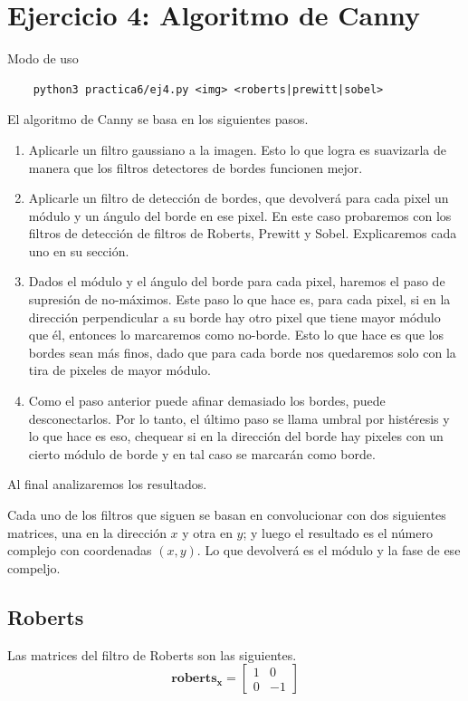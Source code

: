 \documentclass[11pt, spanish]{article}
\begin{document}
\newpage
\section{Ejercicio 4: Algoritmo de Canny}

Modo de uso
\begin{verbatim}
    python3 practica6/ej4.py <img> <roberts|prewitt|sobel>
\end{verbatim}

El algoritmo de Canny se basa en los siguientes pasos.

\begin{enumerate}
\item Aplicarle un filtro gaussiano a la imagen. Esto lo que logra es suavizarla de manera que los filtros detectores de bordes funcionen mejor.
\item Aplicarle un filtro de detección de bordes, que devolverá para cada pixel un módulo y un ángulo del borde en ese pixel. En este caso probaremos con los filtros de detección de filtros de Roberts, Prewitt y Sobel. Explicaremos cada uno en su sección.
\item Dados el módulo y el ángulo del borde para cada pixel, haremos el paso de supresión de no-máximos. Este paso lo que hace es, para cada pixel, si en la dirección perpendicular a su borde hay otro pixel que tiene mayor módulo que él, entonces lo marcaremos como no-borde.
Esto lo que hace es que los bordes sean más finos, dado que para cada borde nos quedaremos solo con la tira de pixeles de mayor módulo.
\item Como el paso anterior puede afinar demasiado los bordes, puede desconectarlos. Por lo tanto, el último paso se llama umbral por histéresis y lo que hace es eso, chequear si en la dirección del borde hay pixeles con un cierto módulo de borde y en tal caso se marcarán como borde.
\end{enumerate}

Al final analizaremos los resultados.

Cada uno de los filtros que siguen se basan en convolucionar con dos siguientes matrices, una en la dirección $x$ y otra en $y$; y luego el resultado es el número complejo con coordenadas $(x,y)$. Lo que devolverá es el módulo y la fase de ese compeljo.



\subsection{Roberts}
Las matrices del filtro de Roberts son las siguientes.
\[
\mathbf{roberts_x} = \begin{bmatrix} 
1 & 0 \\
0 & -1
\end{bmatrix}
\]
\end{document}
